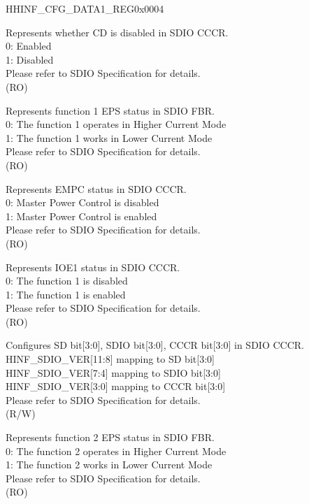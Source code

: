 \begin{register}{H}{HINF\_CFG\_DATA1\_REG}{0x0004}
\begin{regdesc}\begin{reglist}
\item [Continued from the previous page...]
\label{fielddesc:HINFCDDISABLE}\item [HINF\_CD\_DISABLE] Represents whether CD is disabled in SDIO CCCR.\\
0: Enabled\\
1: Disabled\\
Please refer to SDIO Specification for details.\\
(RO)
\label{fielddesc:HINFFUNC1EPS}\item [HINF\_FUNC1\_EPS] Represents function 1 EPS status in SDIO FBR.\\
0: The function 1 operates in Higher Current Mode\\
1: The function 1 works in Lower Current Mode\\
Please refer to SDIO Specification for details.\\
(RO)
\label{fielddesc:HINFEMP}\item [HINF\_EMP] Represents EMPC status in SDIO CCCR.\\
0: Master Power Control is disabled\\
1: Master Power Control is enabled\\
Please refer to SDIO Specification for details. \\
(RO)
\label{fielddesc:HINFIOENABLE1}\item [HINF\_IOENABLE1] Represents IOE1 status in SDIO CCCR.\\
0: The function 1 is disabled\\
1: The function 1 is enabled\\
Please refer to SDIO Specification for details.\\
(RO)
\label{fielddesc:HINFSDIOVER}\item [HINF\_SDIO\_VER] Configures SD bit[3:0], SDIO bit[3:0], CCCR bit[3:0] in SDIO CCCR.\\
HINF\_SDIO\_VER[11:8] mapping to SD bit[3:0]\\
HINF\_SDIO\_VER[7:4] mapping to SDIO bit[3:0]\\
HINF\_SDIO\_VER[3:0] mapping to CCCR bit[3:0]\\
Please refer to SDIO Specification for details.\\
(R/W)
\label{fielddesc:HINFFUNC2EPS}\item [HINF\_FUNC2\_EPS] Represents function 2 EPS status in SDIO FBR.\\
0: The function 2 operates in Higher Current Mode\\
1: The function 2 works in Lower Current Mode\\
Please refer to SDIO Specification for details. \\
(RO)
\end{reglist}\end{regdesc}
\end{register}

